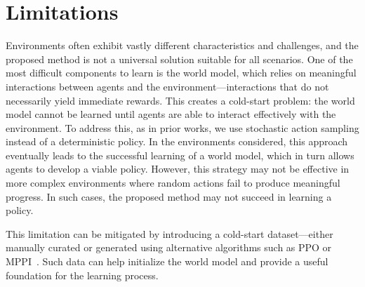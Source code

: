 \section{Limitations}

Environments often exhibit vastly different characteristics and challenges, and the proposed method is not a universal solution suitable for all scenarios. One of the most difficult components to learn is the world model, which relies on meaningful interactions between agents and the environment—interactions that do not necessarily yield immediate rewards. This creates a cold-start problem: the world model cannot be learned until agents are able to interact effectively with the environment. To address this, as in prior works, we use stochastic action sampling instead of a deterministic policy. In the environments considered, this approach eventually leads to the successful learning of a world model, which in turn allows agents to develop a viable policy. However, this strategy may not be effective in more complex environments where random actions fail to produce meaningful progress. In such cases, the proposed method may not succeed in learning a policy.

This limitation can be mitigated by introducing a cold-start dataset—either manually curated or generated using alternative algorithms such as PPO or MPPI~\cite{Alvarez24}. Such data can help initialize the world model and provide a useful foundation for the learning process.
